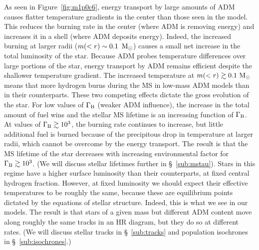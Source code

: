 \documentclass[useAMS,usenatbib]{mnras}
\begin{document}
As seen in Figure~\ref{fig:m1p0c6}, 
energy transport by large amounts of ADM causes flatter temperature gradients in the center 
than those seen in the \nodm model. This reduces the burning rate 
in the center (where ADM is removing energy) and increases 
it in a shell (where ADM deposits energy). Indeed, 
the increased burning at 
larger radii ($m(<r) \sim 0.1 \, \ \mathrm{M}_{\odot}$) 
causes a small net increase in the total 
luminosity of the star. Because ADM probes temperature differences 
over large portions of the star, 
energy transport by ADM remains efficient despite the shallower 
temperature gradient. The increased temperature at $m(<r) \gtrsim 0.1 \ \mathrm{M}_{\odot}$ 
means that more hydrogen burns during the MS in low-mass ADM models 
than in their \nodm counterparts. These two competing effects 
dictate the gross evolution of the star. For low values of 
$\Gamma_\mathrm{B}$ (weaker ADM influence), the increase in the total 
amount of fuel wins and the stellar MS lifetime is an  
increasing function of $\Gamma_\mathrm{B}$. At values of $\Gamma_\mathrm{B} \gtrsim 10^3$, 
the burning rate continues to increase, but little additional 
fuel is burned because of the precipitous drop in temperature 
at larger radii, which cannot be overcome by the energy transport. 
The result is that the MS lifetime of the star decreases 
with increasing environmental factor for $\Gamma_\mathrm{B} \gtrsim 10^3$. 
(We will discuss stellar lifetimes further in \S~\ref{sub:mstau}).
Stars in this regime have a higher surface luminosity than their \nodm counterparts, at fixed central hydrogen fraction. However, at fixed luminosity we should expect their effective temperatures to be roughly the same, because these are equilibrium points dictated by the equations of stellar structure. Indeed, this is what we see in our models. The result is that stars of a given mass but different ADM content move along roughly the same tracks in an HR diagram, but they do so at different rates. (We will discuss stellar tracks in \S~\ref{sub:tracks} and population isochrones in \S~\ref{sub:isochrones}.)
\end{document}
